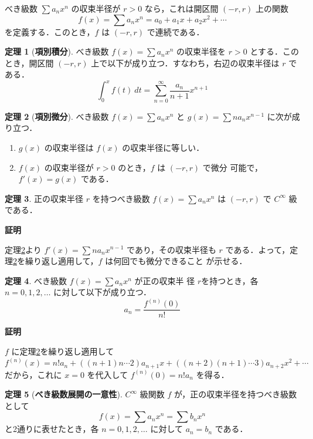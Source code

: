 \documentclass[10pt, uplatex, dvipdfmx]{jsarticle}
\makeatletter
\renewenvironment{proof}[1][\proofname]{\par
  \pushQED{\qed}%
  \normalfont \topsep6\p@\@plus6\p@\relax
  \trivlist
  \item\relax
  {\bfseries
  #1\@addpunct{.}}\hspace\labelsep\ignorespaces
}{%
  \popQED\endtrivlist\@endpefalse
}
\theoremstyle{definition}
\newtheorem{theorem}{定理}[section]
\renewcommand{\proofname}{\textbf{証明}}
\numberwithin{equation}{section}
\makeatother
\begin{document}
べき級数 $\sum a_n x^n$ の収束半径が $r>0$ なら，これは開区間 $(-r,r)$ 上の関数
\[
  f(x) = \sum  a_n x^n = a_0 + a_1 x + a_2 x^2 + \cdots
\]
を定義する．このとき，$f$ は $(-r,r)$ で連続である．

\begin{theorem}[\textbf{項別積分}]\label{thm:term-int}
  べき級数 $f(x) = \sum a_n x^n$ の収束半径を $r>0$
  とする．このとき，開区間 $(-r,r)$ 上で以下が成り立つ．すなわち，右辺の収束半径は $r$ である．
  \[
    \int_{0}^{x} f(t) \ dt = \sum_{n=0}^{\infty} \frac{a_n}{n+1}x^{n+1}
  \]
\end{theorem}

\begin{theorem}[\textbf{項別微分}]\label{thm:term-diff}
  べき級数 $f(x) = \sum a_n x^n$ と
  $g(x) = \sum  na_n x^{n-1}$ に次が成り立つ．
  \begin{enumerate}[(1)]
    
  \item $g(x)$ の収束半径は $f(x)$ の収束半径に等しい．

  \item $f(x)$ の収束半径が $r>0$ のとき，$f$ は $(-r,r)$ で微分
    可能で，$f'(x) = g(x)$ である．
  \end{enumerate}
\end{theorem}

\begin{theorem}
  正の収束半径 $r$ を持つべき級数 $f(x) = \sum  a_n
  x^n$ は $(-r,r)$ で $C^{\infty}$ 級である．
\end{theorem}
\begin{proof}
  定理\ref{thm:term-diff}より $f'(x) = \sum  n a_n
  x^{n-1}$ であり，その収束半径も $r$ である．よって，定
  理\ref{thm:term-diff}を繰り返し適用して，$f$ は何回でも微分できること
  が示せる．
\end{proof}

\begin{theorem}\label{thm:coeff}
  べき級数 $f(x) = \sum  a_n x^n$ が正の収束半
  径 $r$を持つとき，各 $n=0,1,2,\ldots$ に対して以下が成り立つ．
  \[
    a_n = \frac{f^{(n)}(0)}{n!}
  \]
\end{theorem}
\begin{proof}
  $f$ に定理\ref{thm:term-diff}を繰り返し適用して
  \[
    f^{(n)}(x) = n! a_n + \left( (n+1)n \cdots  2\right)a_{n+1} x + \left( (n+2)(n+1)\cdots 3\right) a_{n+2} x^2 + \cdots
  \]
  だから，これに $x=0$ を代入して $f^{(n)}(0) = n! a_n$ を得る．
\end{proof}

\begin{theorem}[\textbf{べき級数展開の一意性}]\label{thm:unique-seriese}
  $C^{\infty}$ 級関数 $f$ が，正の収束半径を持つべき級数として
  \[
    f(x) = \sum  a_n x^n = \sum b_n x^n
  \]
  と2通りに表せたとき，各 $n=0,1,2,\ldots$ に対して $a_n=b_n$ である．
\end{theorem}
\end{document}
